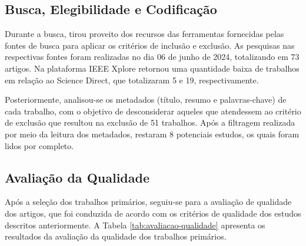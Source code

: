 \subsection{Busca, Elegibilidade e Codificação}
\label{subsec:busca-elegibilidade}

Durante a busca, tirou proveito dos recursos das ferramentas fornecidas pelas fontes de busca
para aplicar os critérios de inclusão e exclusão. As pesquisas nas respectivas fontes foram realizadas
no dia 06 de junho de 2024, totalizando em 73 artigos. Na plataforma IEEE Xplore retornou uma
quantidade baixa de trabalhos em relação ao Science Direct, que totalizaram 5 e 19, respectivamente.

Posteriormente, analisou-se os metadados (título, resumo e palavras-chave) de cada
trabalho, com o objetivo de desconsiderar aqueles que atendessem ao critério de exclusão que
resultou na exclusão de 51 trabalhos. Após a filtragem realizada por meio da leitura dos metadados,
restaram 8 potenciais estudos, os quais foram lidos por completo.

\subsection{Avaliação da Qualidade}
\label{subsec:avaliacao-qualidade}

Após a seleção dos trabalhos primários, seguiu-se para a avaliação de qualidade dos artigos,
que foi conduzida de acordo com os critérios de qualidade dos estudos descritos anteriormente. A
Tabela \ref{tab:avaliacao-qualidade} apresenta os resultados da avaliação da qualidade dos trabalhos
primários.

